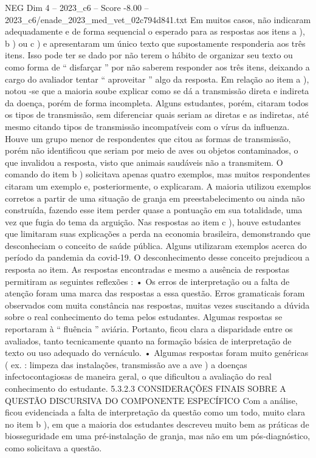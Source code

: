 \begin{textsample}{NEG Dim 4 – 2023\_c6 – Score -8.00 – 2023\_c6/enade\_2023\_med\_vet\_02c794d841.txt}
Em muitos casos, não indicaram adequadamente e de forma sequencial o esperado para as respostas aos itens a ), b ) ou c ) e apresentaram um único texto que supostamente responderia aos três itens.
Isso pode ter se dado por não terem o hábito de organizar seu texto ou como forma de “ disfarçar ” por não saberem responder aos três itens, deixando a cargo do avaliador tentar “ aproveitar ” algo da resposta.
Em relação ao item a ), notou -se que a maioria soube explicar como se dá a transmissão direta e indireta da doença, porém de forma incompleta.
Alguns estudantes, porém, citaram todos os tipos de transmissão, sem diferenciar quais seriam as diretas e as indiretas, até mesmo citando tipos de transmissão incompatíveis com o vírus da influenza.
Houve um grupo menor de respondentes que citou as formas de transmissão, porém não identificou que seriam por meio de aves ou objetos contaminados, o que invalidou a resposta, visto que animais saudáveis não a transmitem.
O comando do item b ) solicitava apenas quatro exemplos, mas muitos respondentes citaram um exemplo e, posteriormente, o explicaram.
A maioria utilizou exemplos corretos a partir de uma situação de granja em preestabelecimento ou ainda não construída, fazendo esse item perder quase a pontuação em sua totalidade, uma vez que fugia do tema da arguição.
Nas respostas ao item c ), houve estudantes que limitaram suas explicações a perda na economia brasileira, demonstrando que desconheciam o conceito de saúde pública.
Alguns utilizaram exemplos acerca do período da pandemia da covid-19.
O desconhecimento desse conceito prejudicou a resposta ao item.
As respostas encontradas e mesmo a ausência de respostas permitiram as seguintes reflexões : • Os erros de interpretação ou a falta de atenção foram uma marca das respostas a essa questão.
Erros gramaticais foram observados com muita constância nas respostas, muitas vezes suscitando a dúvida sobre o real conhecimento do tema pelos estudantes.
Algumas respostas se reportaram à “ fluência ” aviária.
Portanto, ficou clara a disparidade entre os avaliados, tanto tecnicamente quanto na formação básica de interpretação de texto ou uso adequado do vernáculo. • Algumas respostas foram muito genéricas ( ex. : limpeza das instalações, transmissão ave a ave ) a doenças infectocontagiosas de maneira geral, o que dificultou a avaliação do real conhecimento do estudante. 5.3.2.3 CONSIDERAÇÕES FINAIS SOBRE A QUESTÃO DISCURSIVA DO COMPONENTE ESPECÍFICO Com a análise, ficou evidenciada a falta de interpretação da questão como um todo, muito clara no item b ), em que a maioria dos estudantes descreveu muito bem as práticas de biosseguridade em uma pré-instalação de granja, mas não em um pós-diagnóstico, como solicitava a questão.

\end{textsample}

